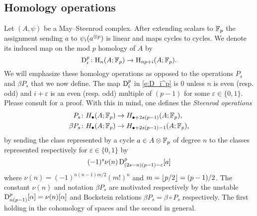 \subsection{Homology operations}

Let $(A,\psi)$ be a May--Steenrod complex.
After extending scalars to ${\mathbb{F}_p}$ the assignment sending $a$ to $\psi_i(a^{\otimes p})$ is linear and maps cycles to cycles.
We denote its induced map on the mod $p$ homology of $A$ by
\begin{equation}\label{e:D_i^p}
	\mathrm{D}_i^p \colon \mathrm{H}_n(A; {\mathbb{F}_p}) \to \mathrm{H}_{np+i}(A; {\mathbb{F}_p}).
\end{equation}
We will emphasize these homology operations as opposed to the operations $P_s$ and $\beta P_s$ that we now define.
The map $\mathrm{D}_i^p$ in \eqref{e:D_i^p} is $0$ unless $n$ is even (resp. odd) and $i+\varepsilon$ is an even (resp. odd) multiple of $(p-1)$ for some $\varepsilon \in \{0,1\}$.
Please consult \cite[Proposition 2.3. (iv)]{may1970general} for a proof.
With this in mind, one defines the \textit{Steenrod operations}
\begin{align*}
	P_s \colon& H_\bullet(A; {\mathbb{F}_p}) \to H_{\bullet + 2s(p-1)}(A; {\mathbb{F}_p}), \\
	\beta P_s \colon& H_\bullet(A; {\mathbb{F}_p}) \to H_{\bullet + 2s(p-1) - 1}(A; {\mathbb{F}_p}),
\end{align*}
by sending the class represented by a cycle $a \in A \otimes {\mathbb{F}_p}$ of degree $n$ to the classes represented respectively for $\varepsilon \in \{0,1\}$ by
\begin{equation*}
	(-1)^s \nu(n) \, \mathrm{D}^p_{(2s-n)(p-1)-\varepsilon}[a]
\end{equation*}
where $\nu(n) = (-1)^{n(n-1)m/2}(m!)^n$ and $m = \lfloor p/2\rfloor = (p-1)/2$.
The constant $\nu(n)$ and notation $\beta P_s$ are motivated respectively by the unstable $\mathrm{D}_{n(p-1)}^p[\alpha] = \nu(n)[\alpha]$ and Bockstein relations $\beta P_s = \beta \circ P_s$ respectively.
The first holding in the cohomology of spaces and the second in general.